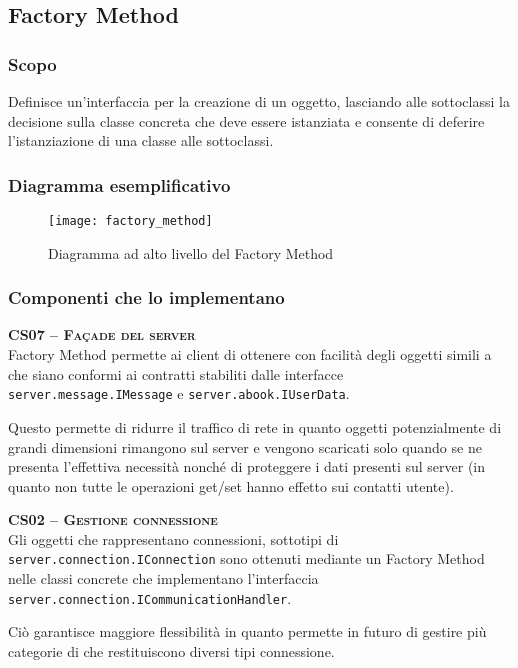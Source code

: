 \subsection{Factory Method}

\subsubsection{Scopo}
Definisce un'interfaccia per la creazione di un oggetto, lasciando alle sottoclassi la decisione sulla classe concreta che deve essere istanziata e consente di deferire l'istanziazione di una classe alle sottoclassi.

\subsubsection{Diagramma esemplificativo}
\begin{figure}[H]
  \centering
  \texttt{[image: factory\_method]}
  \caption{Diagramma ad alto livello del  Factory Method}\label{fig:factory_method}
\end{figure}

\subsubsection{Componenti che lo implementano}
\begin{description}
  \item{\scshape\bfseries CS07 -- Façade del server}\\
Factory Method permette ai client di ottenere con facilità degli oggetti simili a  che siano conformi ai contratti stabiliti dalle interfacce \texttt{server.message.IMessage} e \texttt{server.abook.IUserData}.

Questo permette di ridurre il traffico di rete in quanto oggetti potenzialmente di grandi dimensioni rimangono sul server e vengono scaricati solo quando se ne presenta l'effettiva necessità nonché di proteggere i dati presenti sul server (in quanto non tutte le operazioni get/set hanno effetto sui contatti utente).

  \item{\scshape\bfseries CS02 -- Gestione connessione}\\
Gli oggetti che rappresentano connessioni, sottotipi di \texttt{server.connection.IConnection} sono ottenuti mediante un Factory Method nelle classi concrete che implementano l'interfaccia \texttt{server.connection.ICommunicationHandler}.

Ciò garantisce maggiore flessibilità in quanto permette in futuro di gestire più categorie di  che restituiscono diversi tipi connessione.
\end{description}

